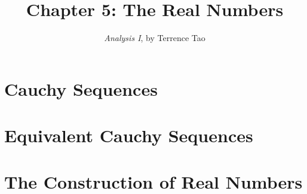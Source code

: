 \documentclass{extarticle}
\title{\vspace{-2em}Chapter 5: The Real Numbers}
\author{\emph{Analysis I}, by Terrence Tao}
\date{}
\begin{document}
\maketitle



\section{Cauchy Sequences}


\section{Equivalent Cauchy Sequences}

\break

\section{The Construction of Real Numbers}

\break
\end{document}
